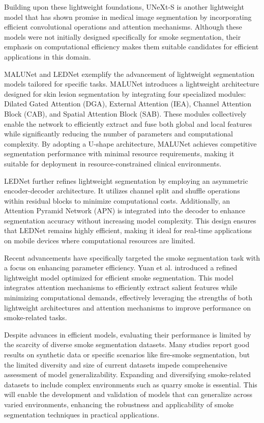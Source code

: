 Building upon these lightweight foundations, UNeXt-S \cite{valanarasu2022unext} is another lightweight model that has shown promise in medical image segmentation by incorporating efficient convolutional operations and attention mechanisms. Although these models were not initially designed specifically for smoke segmentation, their emphasis on computational efficiency makes them suitable candidates for efficient applications in this domain.

MALUNet \cite{ruan2022malunet} and LEDNet \cite{wang2019lednet} exemplify the advancement of lightweight segmentation models tailored for specific tasks. MALUNet introduces a lightweight architecture designed for skin lesion segmentation by integrating four specialized modules: Dilated Gated Attention (DGA), External Attention (IEA), Channel Attention Block (CAB), and Spatial Attention Block (SAB). These modules collectively enable the network to efficiently extract and fuse both global and local features while significantly reducing the number of parameters and computational complexity. By adopting a U-shape architecture, MALUNet achieves competitive segmentation performance with minimal resource requirements, making it suitable for deployment in resource-constrained clinical environments.

LEDNet further refines lightweight segmentation by employing an asymmetric encoder-decoder architecture. It utilizes channel split and shuffle operations within residual blocks to minimize computational costs. Additionally, an Attention Pyramid Network (APN) is integrated into the decoder to enhance segmentation accuracy without increasing model complexity. This design ensures that LEDNet remains highly efficient, making it ideal for real-time applications on mobile devices where computational resources are limited.

Recent advancements have specifically targeted the smoke segmentation task with a focus on enhancing parameter efficiency. Yuan et al. \cite{yuan2023lightweight} introduced a refined lightweight model optimized for efficient smoke segmentation. This model integrates attention mechanisms to efficiently extract salient features while minimizing computational demands, effectively leveraging the strengths of both lightweight architectures and attention mechanisms to improve performance on smoke-related tasks.

Despite advances in efficient models, evaluating their performance is limited by the scarcity of diverse smoke segmentation datasets. Many studies report good results on synthetic data or specific scenarios like fire-smoke segmentation, but the limited diversity and size of current datasets impede comprehensive assessment of model generalizability. Expanding and diversifying smoke-related datasets to include complex environments such as quarry smoke is essential. This will enable the development and validation of models that can generalize across varied environments, enhancing the robustness and applicability of smoke segmentation techniques in practical applications.


